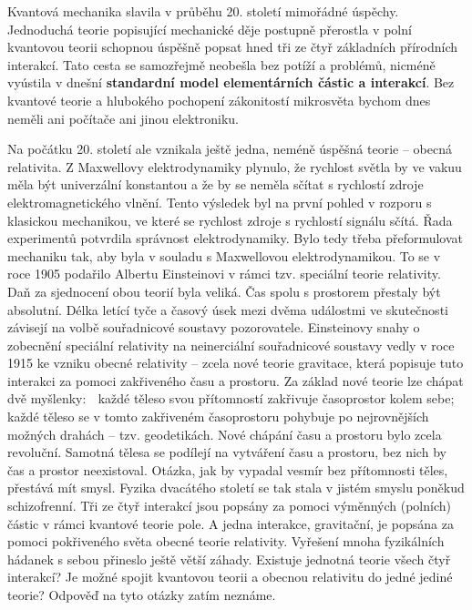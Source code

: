     Kvantová mechanika slavila v průběhu 20. století mimořádné úspěchy. Jednoduchá teorie popisující
    mechanické děje postupně přerostla v polní kvantovou teorii schopnou úspěšně popsat hned tři ze
    čtyř základních přírodních interakcí. Tato cesta se samozřejmě neobešla bez potíží a problémů,
    nicméně vyústila v dnešní \textbf{standardní model elementárních částic a interakcí}. Bez
    kvantové teorie a hlubokého pochopení zákonitostí mikrosvěta bychom dnes neměli ani počítače ani
    jinou elektroniku. 

    Na počátku 20. století ale vznikala ještě jedna, neméně úspěšná teorie – obecná relativita. Z Maxwellovy elektrodynamiky plynulo, že rychlost světla by ve vakuu měla být
    univerzální konstantou a že by se neměla sčítat s rychlostí zdroje elektromagnetického
    vlnění. Tento výsledek byl na první pohled v rozporu s klasickou mechanikou, ve které
    se rychlost zdroje s rychlostí signálu sčítá. Řada experimentů potvrdila správnost elektrodynamiky. Bylo tedy třeba přeformulovat mechaniku tak, aby byla v souladu s Maxwellovou elektrodynamikou. To se v roce 1905 podařilo Albertu Einsteinovi v rámci
    tzv. speciální teorie relativity. Daň za sjednocení obou teorií byla veliká. Čas spolu
    s prostorem přestaly být absolutní. Délka letící tyče a časový úsek mezi dvěma událostmi ve skutečnosti závisejí na volbě souřadnicové soustavy pozorovatele.
    Einsteinovy snahy o zobecnění speciální relativity na neinerciální souřadnicové soustavy vedly v roce 1915 ke vzniku obecné relativity – zcela nové teorie gravitace, která
    popisuje tuto interakci za pomoci zakřiveného času a prostoru. Za základ nové teorie lze
    chápat dvě myšlenky:
     každé těleso svou přítomností zakřivuje časoprostor kolem sebe;
     každé těleso se v tomto zakřiveném časoprostoru pohybuje po nejrovnějších
    možných drahách – tzv. geodetikách.
    Nové chápání času a prostoru bylo zcela revoluční. Samotná tělesa se podílejí na vytváření času a prostoru, bez nich by čas a prostor neexistoval. Otázka, jak by vypadal vesmír bez přítomnosti těles, přestává mít smysl.
    Fyzika dvacátého století se tak stala v jistém smyslu poněkud schizofrenní. Tři ze čtyř
    interakcí jsou popsány za pomoci výměnných (polních) částic v rámci kvantové teorie
    pole. A jedna interakce, gravitační, je popsána za pomoci pokřiveného světa obecné
    teorie relativity. Vyřešení mnoha fyzikálních hádanek s sebou přineslo ještě větší záhady. Existuje jednotná teorie všech čtyř interakcí? Je možné spojit kvantovou teorii
    a obecnou relativitu do jedné jediné teorie? Odpověď na tyto otázky zatím neznáme.
